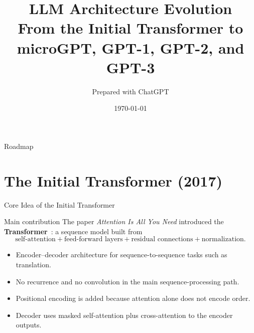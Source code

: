 \documentclass[10pt,aspectratio=169]{beamer}
\title[LLM Architecture Evolution]{LLM Architecture Evolution\\From the Initial Transformer to microGPT, GPT-1, GPT-2, and GPT-3}
\author{Prepared with ChatGPT}
\institute{}
\date{\today}
\begin{document}
\begin{frame}
  \titlepage
\end{frame}

\begin{frame}{Roadmap}
  \tableofcontents
\end{frame}

\section{The Initial Transformer (2017)}

\begin{frame}{Core Idea of the Initial Transformer}
\begin{block}{Main contribution}
The paper \emph{Attention Is All You Need} introduced the \textbf{Transformer}~\cite{vaswani2017attention}: a sequence model built from
\[
\text{self-attention} + \text{feed-forward layers} + \text{residual connections} + \text{normalization}.
\]
\end{block}
\vspace{0.3em}
\begin{itemize}
  \item Encoder--decoder architecture for sequence-to-sequence tasks such as translation.
  \item No recurrence and no convolution in the main sequence-processing path.
  \item Positional encoding is added because attention alone does not encode order.
  \item Decoder uses masked self-attention plus cross-attention to the encoder outputs.
\end{itemize}
\end{frame}
\end{document}
